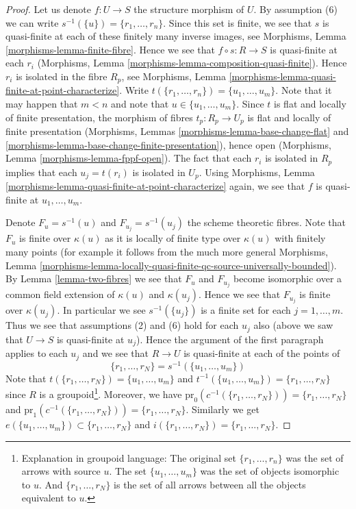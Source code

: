 \begin{proof}
Let us denote $f : U \to S$ the structure morphism of $U$.
By assumption (6) we can write $s^{-1}(\{u\}) = \{r_1, \ldots, r_n\}$.
Since this set is finite, we see that $s$ is quasi-finite at each of
these finitely many inverse images, see
Morphisms, Lemma \ref{morphisms-lemma-finite-fibre}.
Hence we see that $f \circ s : R \to S$ is quasi-finite at each $r_i$
(Morphisms, Lemma \ref{morphisms-lemma-composition-quasi-finite}).
Hence $r_i$ is isolated in the fibre $R_p$, see
Morphisms, Lemma \ref{morphisms-lemma-quasi-finite-at-point-characterize}.
Write $t(\{r_1, \ldots, r_n\}) = \{u_1, \ldots, u_m\}$.
Note that it may happen that $m < n$ and note that
$u \in \{u_1, \ldots, u_m\}$.
Since $t$ is flat and locally of finite presentation,
the morphism of fibres $t_p : R_p \to U_p$ is flat and locally of
finite presentation (Morphisms,
Lemmas \ref{morphisms-lemma-base-change-flat} and
\ref{morphisms-lemma-base-change-finite-presentation}),
hence open (Morphisms,
Lemma \ref{morphisms-lemma-fppf-open}).
The fact that each $r_i$ is isolated in $R_p$ implies that
each $u_j = t(r_i)$ is isolated in $U_p$. Using
Morphisms, Lemma \ref{morphisms-lemma-quasi-finite-at-point-characterize}
again, we see that $f$ is quasi-finite at $u_1, \ldots, u_m$.

\medskip\noindent
Denote $F_u = s^{-1}(u)$ and $F_{u_j} = s^{-1}(u_j)$ the scheme theoretic
fibres. Note that $F_u$ is finite over $\kappa(u)$ as it is locally of finite
type over $\kappa(u)$ with finitely many points (for example it follows from
the much more general
Morphisms, Lemma
\ref{morphisms-lemma-locally-quasi-finite-qc-source-universally-bounded}).
By
Lemma \ref{lemma-two-fibres}
we see that $F_u$ and $F_{u_j}$ become isomorphic over a common
field extension of $\kappa(u)$ and $\kappa(u_j)$. Hence we see
that $F_{u_j}$ is finite over $\kappa(u_j)$. In particular we see
$s^{-1}(\{u_j\})$ is a finite set for each $j = 1, \ldots, m$.
Thus we see that assumptions (2) and (6) hold for each $u_j$ also
(above we saw that $U \to S$ is quasi-finite at $u_j$).
Hence the argument of the first paragraph applies to each $u_j$
and we see that $R \to U$ is quasi-finite at each of the points of
$$
\{r_1, \ldots, r_N\} = s^{-1}(\{u_1, \ldots, u_m\})
$$
Note that $t(\{r_1, \ldots, r_N\}) = \{u_1, \ldots, u_m\}$ and
$t^{-1}(\{u_1, \ldots, u_m\}) = \{r_1, \ldots, r_N\}$
since $R$ is a groupoid\footnote{Explanation in groupoid language:
The original set $\{r_1, \ldots, r_n\}$ was the set of arrows with
source $u$. The set $\{u_1, \ldots, u_m\}$ was the set of objects
isomorphic to $u$. And $\{r_1, \ldots, r_N\}$ is the set of all arrows
between all the objects equivalent to $u$.}. Moreover, we have
$\text{pr}_0(c^{-1}(\{r_1, \ldots, r_N\})) = \{r_1, \ldots, r_N\}$
and
$\text{pr}_1(c^{-1}(\{r_1, \ldots, r_N\})) = \{r_1, \ldots, r_N\}$.
Similarly we get $e(\{u_1, \ldots, u_m\}) \subset \{r_1, \ldots, r_N\}$
and $i(\{r_1, \ldots, r_N\}) = \{r_1, \ldots, r_N\}$.


\end{proof}
